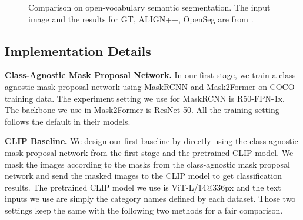 \documentclass{article}
\theoremstyle{plain}
\theoremstyle{definition}
\theoremstyle{remark}
\begin{document}
\begin{figure*}[!htp]
\begin{center}
\caption{\small Comparison on open-vocabulary semantic segmentation. The input image and the results for GT, ALIGN++, OpenSeg are from  \citep{ghiasi2021open}.}

\label{fig:comp}
\end{center}
\end{figure*}

\subsection{Implementation Details}


\textbf{Class-Agnostic Mask Proposal Network.} In our first stage, we train a class-agnostic mask proposal network using MaskRCNN \citep{he2017mask} and Mask2Former \citep{cheng2021masked} on COCO training data. The experiment setting we use for MaskRCNN is R50-FPN-1x. The backbone we use in Mask2Former is ResNet-50. All the training setting follows the default in their models.

\textbf{CLIP Baseline.} We design our first baseline by directly using the class-agnostic mask proposal network from the first stage and the pretrained CLIP model. We mask the images according to the masks from the class-agnostic mask proposal network and send the masked images to the CLIP model to get classification results. The pretrained CLIP model we use is ViT-L/14@336px and the text inputs we use are simply the category names defined by each dataset. Those two settings keep the same with the following two methods for a fair comparison.
\end{document}
